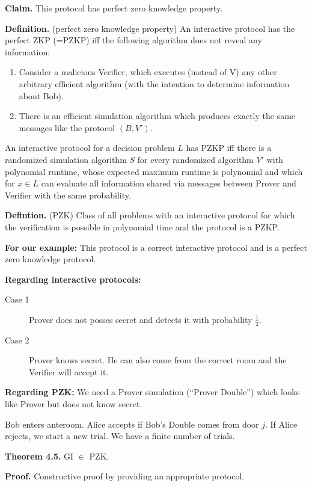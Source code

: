 \documentclass[a4paper]{article}
\newcommand{\cls}[1]{\rm{#1}}
\begin{document}
\textbf{Claim.}
  This protocol has perfect zero knowledge property.

\textbf{Definition.} (perfect zero knowledge property)
  An interactive protocol has the perfect ZKP (=PZKP) iff
  the following algorithm does not reveal any information:
  \begin{enumerate}
    \item Consider a malicious Verifier, which executes
          (instead of V) any other arbitrary efficient algorithm
          (with the intention to determine information about Bob).
    \item There is an efficient simulation algorithm which produces
          exactly the same messages like the protocol $(B, V')$.
  \end{enumerate}

An interactive protocol for a decision problem $L$ has PZKP
iff there is a randomized simulation algorithm $S$ for
every randomized algorithm $V'$ with polynomial runtime,
whose expected maximum runtime is polynomial and which for
$x \in L$ can evaluate all information shared via messages
between Prover and Verifier with the same probability.

\textbf{Defintion.} (\cls{PZK})
\label{class:pzk}
  Class of all problems with an interactive protocol for which
  the verification is possible in polynomial time and the protocol
  is a PZKP.

\textbf{For our example:}
  This protocol is a correct interactive protocol and is a
  perfect zero knowledge protocol.

\textbf{Regarding interactive protocols:}
\begin{description}
  \item[Case 1]
    Prover does not posses secret and detects it with
    probability $\frac12$.
  \item[Case 2]
    Prover knows secret. He can also come from the correct
    room and the Verifier will accept it.
\end{description}

\textbf{Regarding PZK:}
  We need a Prover simulation (``Prover Double'')
  which looks like Prover but does not know secret.

Bob enters anteroom. Alice accepts if Bob's Double comes from
door $j$. If Alice rejects, we start a new trial. We have
a finite number of trials.

\textbf{Theorem 4.5.} \cls{GI} $\in$ PZK.

\textbf{Proof.}
Constructive proof by providing an appropriate protocol.
\end{document}
